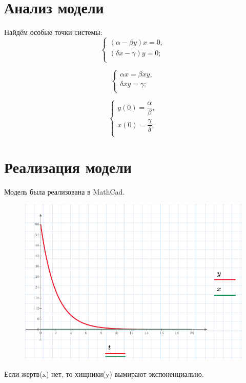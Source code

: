 \documentclass[a4paper, 14pt]{extarticle}
\begin{document}
	\section{Анализ модели}
		Найдём особые точки системы:
		\[ \begin{cases}
			(\alpha - \beta y)x = 0, \\
			(\delta x - \gamma)y = 0; \\
		\end{cases}
		\]
		
		\[ \begin{cases}
			\alpha x = \beta xy, \\
			\delta xy = \gamma; \\
		\end{cases}
		\]
		
		\[ \begin{cases}
			y(0) = \dfrac{\alpha}{\beta}, \\
			x(0) = \dfrac{\gamma}{\delta}; \\
		\end{cases}
		\]
	
	\pagebreak
	\section{Реализация модели}
		Модель была реализована в MathCad.
		\begin{figure}[H]
			\centering
			\includegraphics[width = \linewidth]{1.pdf}
			\caption[.] {}
		\end{figure}
		Если жертв(x) нет, то хищники(y) вымирают экспоненциально.
	
\end{document}
